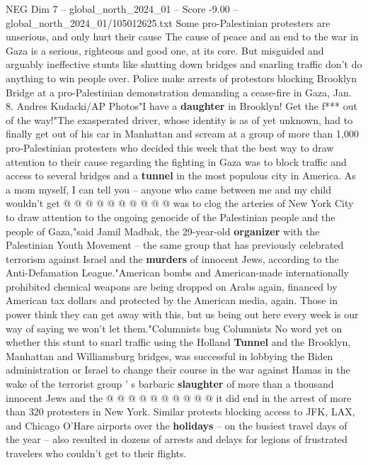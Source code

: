 \begin{textsample}{NEG Dim 7 – global\_north\_2024\_01 – Score -9.00 – global\_north\_2024\_01/105012625.txt}  \label{ex:f7_neg_202}
Some pro-Palestinian protesters are unserious, and only hurt their cause The cause of peace and an end to the war in Gaza is a serious, righteous and good one, at its core.
But misguided and arguably ineffective stunts like shutting down bridges and snarling traffic don't do anything to win people over.
Police make arrests of protestors blocking Brooklyn Bridge at a pro-Palestinian demonstration demanding a cease-fire in Gaza, Jan. 8.
Andres Kudacki/AP Photos"I have a \textbf{daughter} in Brooklyn!
Get the f*** out of the way!"The exasperated driver, whose identity is as of yet unknown, had to finally get out of his car in Manhattan and scream at a group of more than 1,000 pro-Palestinian protesters who decided this week that the best way to draw attention to their cause regarding the fighting in Gaza was to block traffic and access to several bridges and a \textbf{tunnel} in the most populous city in America.
As a mom myself, I can tell you -- anyone who came between me and my child wouldn't get @ @ @ @ @ @ @ @ @ @ was to clog the arteries of New York City to draw attention to the ongoing genocide of the Palestinian people and the people of Gaza,"said Jamil Madbak, the 29-year-old \textbf{organizer} with the Palestinian Youth Movement -- the same group that has previously celebrated terrorism against Israel and the \textbf{murders} of innocent Jews, according to the Anti-Defamation League."American bombs and American-made internationally prohibited chemical weapons are being dropped on Arabs again, financed by American tax dollars and protected by the American media, again.
Those in power think they can get away with this, but us being out here every week is our way of saying we won't let them."Columnists bug Columnists No word yet on whether this stunt to snarl traffic using the Holland \textbf{Tunnel} and the Brooklyn, Manhattan and Williamsburg bridges, was successful in lobbying the Biden administration or Israel to change their course in the war against Hamas in the wake of the terrorist group ' s barbaric \textbf{slaughter} of more than a thousand innocent Jews and the @ @ @ @ @ @ @ @ @ @ it did end in the arrest of more than 320 protesters in New York.
Similar protests blocking access to JFK, LAX, and Chicago O'Hare airports over the \textbf{holidays} -- on the busiest travel days of the year -- also resulted in dozens of arrests and delays for legions of frustrated travelers who couldn't get to their flights.

\end{textsample}
